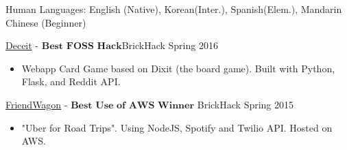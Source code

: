 \documentclass[11pt]{article}
\begin{document}
\inlineskillsection
{Human Languages:}
{English (Native), Korean(Inter.), Spanish(Elem.), Mandarin Chinese (Beginner)}


\nobreakvspace{0.3em}  %


\spacedhrule{0.1em}{0.5em}  %

\projects
{{\href{https://github.com/gabeochoa/sokim}{Deceit}} - $\textbf{Best FOSS Hack}$}{BrickHack Spring 2016}
{
    \begin{itemize}[label={}]
        \setlength\itemsep{.005ex}
        \item{Webapp Card Game based on Dixit (the board game). Built with Python, Flask, and Reddit API.}
    \end{itemize}
}

\headedsubsection
{{\href{https://github.com/alanplotko/RoadTrip}{FriendWagon}} - $\textbf{Best Use of AWS Winner}$ }
{BrickHack Spring 2015}
{
    \begin{itemize}[label={}]
    	\setlength\itemsep{.005ex}
        \item{"Uber for Road Trips". Using NodeJS, Spotify and Twilio API. Hosted on AWS.}
    \end{itemize}
}
\end{document}

